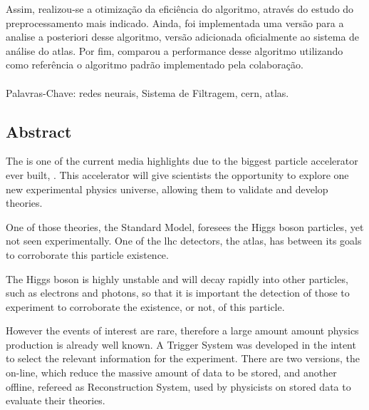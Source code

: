 Assim, realizou-se a otimização da eficiência do algoritmo, 
através do estudo do preprocessamento mais indicado. 
Ainda, foi implementada uma versão para a analise 
a posteriori desse algoritmo, versão adicionada oficialmente ao
sistema de análise do \gls{atlas}. Por fim, comparou a performance desse algoritmo 
utilizando como referência o algoritmo padrão implementado pela colaboração.

\paragraph{}

\noindent Palavras-Chave:  redes neurais, Sistema de Filtragem, \acrshort{cern},
  \acrshort{atlas}.

\vfill

\cleardoublepage

\vfill
\begin{center}
\section*{Abstract\label{Abstract}}
\end{center}

The  is one of the current
media highlights due to the biggest particle accelerator ever built, . This accelerator will give scientists the opportunity to explore 
one new experimental physics universe, allowing them to validate and develop
theories.

One of those theories, the Standard Model, foresees the Higgs boson particles,
yet not seen experimentally. One of the \acrshort{lhc} detectors, the
\gls{atlas}, has between its goals to corroborate this particle existence.

The Higgs boson is highly unstable and will decay rapidly into other particles,
such as electrons and photons, so that it is important the detection of those to
experiment to corroborate the existence, or not, of this particle.

However the events of interest are rare, therefore a large amount amount physics
production is already well known. A Trigger System was developed in the
intent to select the relevant information for the experiment. There are two
versions, the on-line, which reduce the massive amount of data
to be stored, and another offline, refereed as Reconstruction System, used by 
physicists on stored data to evaluate their theories.

